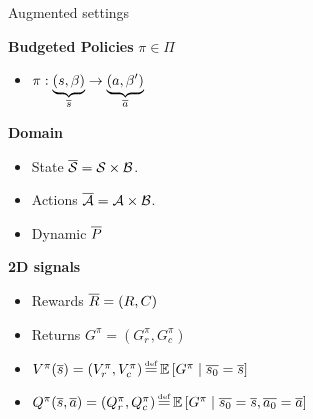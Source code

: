 \documentclass{beamer}
\begin{document}
    \begin{frame}{Augmented settings}

        \textbf{Budgeted Policies} $\pi\in\Pi$
        \begin{itemize}
            \item $ \pi:\underbrace{(s,\beta)}_{\overline{s}} \rightarrow \underbrace{(a,\beta')}_{\overline{a}}$
        \end{itemize}

        \textbf{Domain}
        \begin{itemize}
            \item State $\overline{\mathcal{S}} = \mathcal{S}\times\mathcal{B}$.
            \item Actions $\overline{\mathcal{A}} = \mathcal{A}\times\mathcal{B}$.
            \item Dynamic $\overline{P}$
        \end{itemize}
        \textbf{2D signals}
        \begin{itemize}
            \item Rewards $\overline{R} = (R, C)$
            \item Returns $G^\pi = (G_r^\pi, G_c^\pi)$
            \item $V^\pi(\os) = (V_r^\pi, V_c^\pi) \eqdef \expectedvalue\left[ G^\pi \condbar \ov{s_0} = \os\right]$
            \item $Q^\pi(\os, \oa)= (Q_r^\pi, Q_c^\pi) \eqdef \expectedvalue\left[ G^\pi \condbar \ov{s_0} = \os, \ov{a_0} = \oa\right]$
        \end{itemize}

    \end{frame}
\end{document}
